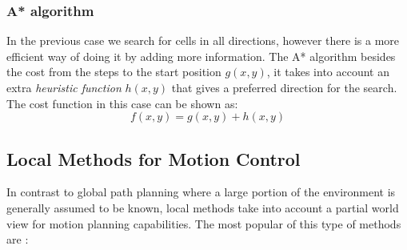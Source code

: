 \subsubsection{A* algorithm}\label{A*}
In the previous case we search for cells in all directions, however there is a more efficient way of doing it by adding more information. The A* algorithm besides the cost from the steps to the start position $g(x,y)$, it takes into account an extra \textit{heuristic function} $h(x, y)$ that gives a preferred direction for the search. 
The cost function in this case can be shown as:
\begin{equation}
    f(x,y)=g(x,y) + h(x,y)
\end{equation}
\subsection{Local Methods for Motion Control }
In contrast to global path planning where a large portion of the environment is generally assumed to be known, local methods take into account a partial world view for motion planning capabilities. The most popular of this type of methods are \cite{inbookdwa}:
